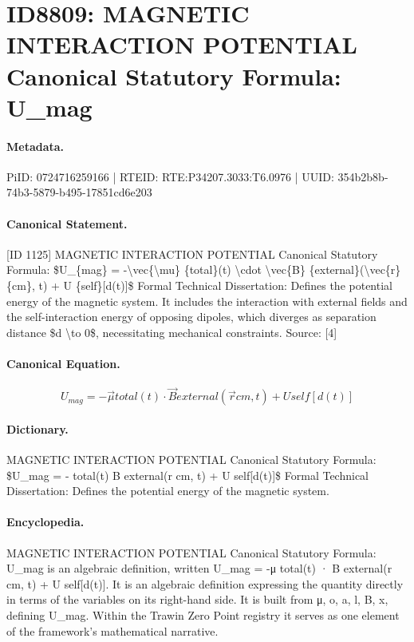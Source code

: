 \section*{ID8809: MAGNETIC INTERACTION POTENTIAL Canonical Statutory Formula: U\_mag}
\paragraph{Metadata.}
PiID: 0724716259166 | RTEID: RTE:P34207.3033:T6.0976 | UUID: 354b2b8b-74b3-5879-b495-17851cd6e203

\paragraph{Canonical Statement.}
[ID 1125] MAGNETIC INTERACTION POTENTIAL Canonical Statutory Formula: \$U\_\{mag\} = -\textbackslash{}vec\{\textbackslash{}mu\} \{total\}(t) \textbackslash{}cdot \textbackslash{}vec\{B\} \{external\}(\textbackslash{}vec\{r\} \{cm\}, t) + U \{self\}[d(t)]\$ Formal Technical Dissertation: Defines the potential energy of the magnetic system. It includes the interaction with external fields and the self-interaction energy of opposing dipoles, which diverges as separation distance \$d \textbackslash{}to 0\$, necessitating mechanical constraints. Source: [4]

\paragraph{Canonical Equation.}
\[
U_{mag} = -\vec{\mu} {total}(t) \cdot \vec{B} {external}(\vec{r} {cm}, t) + U {self}[d(t)]
\]

\paragraph{Dictionary.}
MAGNETIC INTERACTION POTENTIAL Canonical Statutory Formula: \$U\_mag = - total(t) B external(r cm, t) + U self[d(t)]\$ Formal Technical Dissertation: Defines the potential energy of the magnetic system.

\paragraph{Encyclopedia.}
MAGNETIC INTERACTION POTENTIAL Canonical Statutory Formula: U\_mag is an algebraic definition, written U\_mag = -μ total(t) · B external(r cm, t) + U self[d(t)]. It is an algebraic definition expressing the quantity directly in terms of the variables on its right-hand side. It is built from μ, o, a, l, B, x, defining U\_mag. Within the Trawin Zero Point registry it serves as one element of the framework's mathematical narrative.
